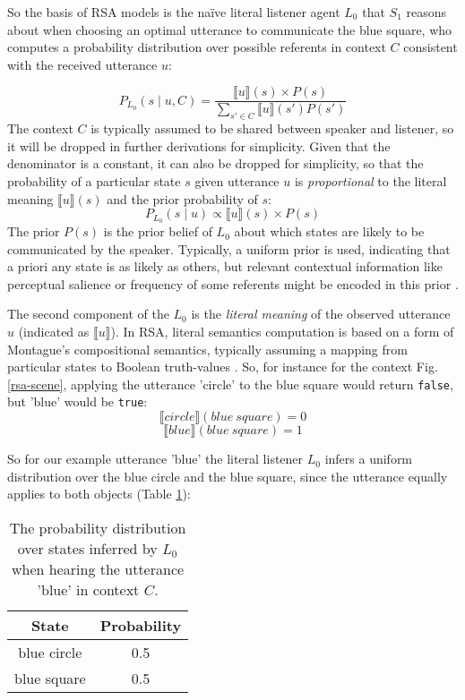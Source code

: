 So the basis of RSA models is the na\"ive literal listener agent $L_0$ that $S_1$ reasons about when choosing an optimal utterance to communicate the blue square, who computes a probability distribution over possible referents in context $C$  consistent with the received utterance $u$: %

$$P_{L_0}(s \mid u, C) = \frac{\llbracket u \rrbracket (s) \times P(s)}{\sum_{s' \in C} \llbracket u \rrbracket (s') P(s')}$$
The context $C$ is typically assumed to be shared between speaker and listener, so it will be dropped in further derivations for simplicity. Given that the denominator is a constant, it can also be dropped for simplicity, so that the probability of a particular state $s$ given utterance $u$ is \emph{proportional} to the literal meaning $\llbracket u \rrbracket (s)$ and the prior probability of $s$: 
$$P_{L_0}(s \mid u) \propto \llbracket u \rrbracket (s) \times P(s)$$
The prior $P(s)$ is the prior belief of $L_0$ about which states are likely to be communicated by the speaker. Typically, a uniform prior is used, indicating that a priori any state is as likely as others, but relevant contextual information like perceptual salience or frequency of some referents might be encoded in this prior \parencite{frank2012predicting}.

The second component of the $L_0$ is the \emph{literal meaning} of the observed utterance $u$ (indicated as $\llbracket u \rrbracket$). In RSA, literal semantics computation is based on a form of Montague’s compositional semantics, typically assuming a mapping from particular states to Boolean truth-values \parencite{montague1973proper} \parencite[but see e.g.][for alternative approaches]{degen2020redundancy}. 
So, for instance for the context Fig. \ref{rsa-scene}, applying the utterance 'circle' to the blue square would return \texttt{false}, but 'blue' would be \texttt{true}:
$$\llbracket circle \rrbracket (blue \: square) = 0$$
$$\llbracket blue \rrbracket (blue\: square) = 1$$
  
So for our example utterance 'blue' the literal listener $L_0$ infers a uniform distribution over the blue circle and the blue square, since the utterance equally applies to both objects (Table \ref{rsa-l0}):

\begin{table}[h]
	\begin{center}
		\caption{The probability distribution over states inferred by $L_0$ when hearing the utterance 'blue' in context $C$.}
		\label{rsa-l0}
		\vskip 0.12in
		\begin{tabular}{cc}
			State & Probability \\
			\hline
			blue circle & 0.5 \\
			blue square & 0.5 \\
			\hline
		\end{tabular}
	\end{center}
\end{table}

